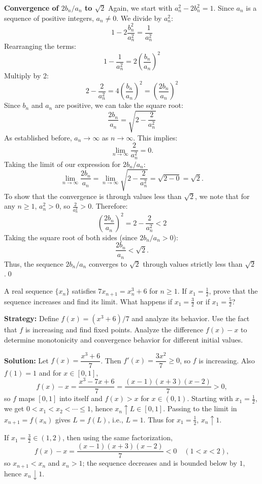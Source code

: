 \textbf{Convergence of $2b_n/a_n$ to $\sqrt{2}$}
Again, we start with $a_n^2 - 2b_n^2 = 1$. Since $a_n$ is a sequence of positive integers, $a_n \neq 0$. We divide by $a_n^2$:
\[ 1 - 2\frac{b_n^2}{a_n^2} = \frac{1}{a_n^2} \]
Rearranging the terms:
\[ 1 - \frac{1}{a_n^2} = 2\left(\frac{b_n}{a_n}\right)^2 \]
Multiply by 2:
\[ 2 - \frac{2}{a_n^2} = 4\left(\frac{b_n}{a_n}\right)^2 = \left(\frac{2b_n}{a_n}\right)^2 \]
Since $b_n$ and $a_n$ are positive, we can take the square root:
\[ \frac{2b_n}{a_n} = \sqrt{2 - \frac{2}{a_n^2}} \]
As established before, $a_n \to \infty$ as $n \to \infty$. This implies:
\[ \lim_{n \to \infty} \frac{2}{a_n^2} = 0. \]
Taking the limit of our expression for $2b_n/a_n$:
\[ \lim_{n \to \infty} \frac{2b_n}{a_n} = \lim_{n \to \infty} \sqrt{2 - \frac{2}{a_n^2}} = \sqrt{2-0} = \sqrt{2}. \]
To show that the convergence is through values less than $\sqrt{2}$, we note that for any $n \geq 1$, $a_n^2 > 0$, so $\frac{2}{a_n^2} > 0$. Therefore:
\[ \left(\frac{2b_n}{a_n}\right)^2 = 2 - \frac{2}{a_n^2} < 2 \]
Taking the square root of both sides (since $2b_n/a_n > 0$):
\[ \frac{2b_n}{a_n} < \sqrt{2}. \]
Thus, the sequence $2b_n/a_n$ converges to $\sqrt{2}$ through values strictly less than $\sqrt{2}$.\qed
\medskip



\begin{problembox}
A real sequence $\{x_n\}$ satisfies $7x_{n+1} = x_n^3 + 6$ for $n \geq 1$. If $x_1 = \frac{1}{2}$, prove that the sequence increases and find its limit. What happens if $x_1 = \frac{3}{2}$ or if $x_1 = \frac{5}{2}$?
\end{problembox}

\noindent\textbf{Strategy:} Define $f(x) = (x^3 + 6)/7$ and analyze its behavior. Use the fact that $f$ is increasing and find fixed points. Analyze the difference $f(x) - x$ to determine monotonicity and convergence behavior for different initial values.

\bigskip\noindent\textbf{Solution:}
Let $f(x)=\dfrac{x^3+6}{7}$. Then $f'(x)=\dfrac{3x^2}{7}\ge 0$, so $f$ is increasing. Also $f(1)=1$ and for $x\in[0,1]$,
\[
f(x)-x=\frac{x^3-7x+6}{7}=\frac{(x-1)(x+3)(x-2)}{7}>0,
\]
so $f$ maps $[0,1]$ into itself and $f(x)>x$ for $x\in(0,1)$. Starting with $x_1=\tfrac12$, we get $0<x_1<x_2<\cdots\le 1$, hence $x_n\uparrow L\in[0,1]$. Passing to the limit in $x_{n+1}=f(x_n)$ gives $L=f(L)$, i.e., $L=\textbf{$1$}$. Thus for $x_1=\tfrac12$, $x_n\uparrow \textbf{$1$}$.

If $x_1=\tfrac32\in(1,2)$, then using the same factorization,
\[
f(x)-x=\frac{(x-1)(x+3)(x-2)}{7}<0\quad(1<x<2),
\]
so $x_{n+1}<x_n$ and $x_n>1$; the sequence decreases and is bounded below by $1$, hence $x_n\downarrow \textbf{$1$}$.

